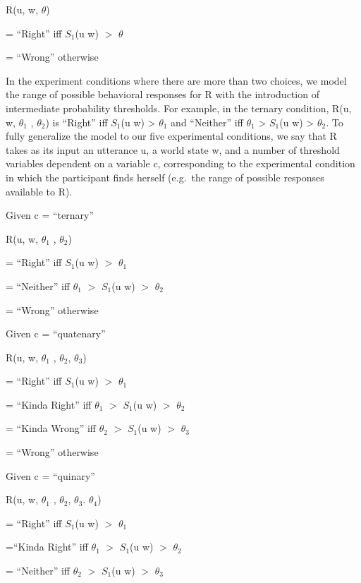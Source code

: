 \documentclass[floatsintext,man]{apa6}
\theoremstyle{definition}
\theoremstyle{definition}
\theoremstyle{definition}
\theoremstyle{remark}
\begin{document}
R(u, w, \(\theta\))

= \enquote{Right} iff \(S_1\)(u \textbar{} w) \(>\) \(\theta\)

= \enquote{Wrong} otherwise

In the experiment conditions where there are more than two choices, we
model the range of possible behavioral responses for R with the
introduction of intermediate probability thresholds. For example, in the
ternary condition, R(u, w, \(\theta_1\) , \(\theta_2\)) is
\enquote{Right} iff \(S_1\)(u \textbar{} w) \textgreater{} \(\theta_1\)
and \enquote{Neither} iff \(\theta_1\) \textgreater{} \(S_1\)(u
\textbar{} w) \textgreater{} \(\theta_2\). To fully generalize the model
to our five experimental conditions, we say that R takes as its input an
utterance u, a world state w, and a number of threshold variables
dependent on a variable c, corresponding to the experimental condition
in which the participant finds herself (e.g.~the range of possible
responses available to R).

Given c = \enquote{ternary}

R(u, w, \(\theta_1\) , \(\theta_2\))

= \enquote{Right} iff \(S_1\)(u \textbar{} w) \(>\) \(\theta_1\)

= \enquote{Neither} iff \(\theta_1\) \(>\) \(S_1\)(u \textbar{} w) \(>\)
\(\theta_2\)

= \enquote{Wrong} otherwise

Given c = \enquote{quatenary}

R(u, w, \(\theta_1\) , \(\theta_2\), \(\theta_3\))

= \enquote{Right} iff \(S_1\)(u \textbar{} w) \(>\) \(\theta_1\)

= \enquote{Kinda Right} iff \(\theta_1\) \(>\) \(S_1\)(u \textbar{} w)
\(>\) \(\theta_2\)

= \enquote{Kinda Wrong} iff \(\theta_2\) \(>\) \(S_1\)(u \textbar{} w)
\(>\) \(\theta_3\)

= \enquote{Wrong} otherwise

Given c = \enquote{quinary}

R(u, w, \(\theta_1\) , \(\theta_2\), \(\theta_3\). \(\theta_4\))

= \enquote{Right} iff \(S_1\)(u \textbar{} w) \(>\) \(\theta_1\)

=\enquote{Kinda Right} iff \(\theta_1\) \(>\) \(S_1\)(u \textbar{} w)
\(>\) \(\theta_2\)

= \enquote{Neither} iff \(\theta_2\) \(>\) \(S_1\)(u \textbar{} w) \(>\)
\(\theta_3\)
\end{document}
